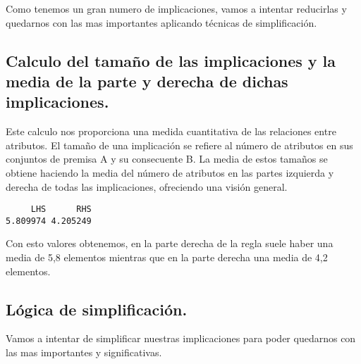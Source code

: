 \documentclass[
  letterpaper,
  DIV=11,
  numbers=noendperiod]{scrreprt}
\newenvironment{Shaded}{\begin{snugshade}}{\end{snugshade}}
\newcommand{\AttributeTok}[1]{\textcolor[rgb]{0.40,0.45,0.13}{#1}}
\newcommand{\FunctionTok}[1]{\textcolor[rgb]{0.28,0.35,0.67}{#1}}
\newcommand{\NormalTok}[1]{\textcolor[rgb]{0.00,0.23,0.31}{#1}}
\newcommand{\SpecialCharTok}[1]{\textcolor[rgb]{0.37,0.37,0.37}{#1}}
\newcommand{\StringTok}[1]{\textcolor[rgb]{0.13,0.47,0.30}{#1}}
\begin{document}
Como tenemos un gran numero de implicaciones, vamos a intentar
reducirlas y quedarnos con las mas importantes aplicando técnicas de
simplificación.

\subsection{Calculo del tamaño de las implicaciones y la media de la
parte y derecha de dichas
implicaciones.}\label{calculo-del-tamauxf1o-de-las-implicaciones-y-la-media-de-la-parte-y-derecha-de-dichas-implicaciones.}

Este calculo nos proporciona una medida cuantitativa de las relaciones
entre atributos. El tamaño de una implicación se refiere al número de
atributos en sus conjuntos de premisa A y su consecuente B. La media de
estos tamaños se obtiene haciendo la media del número de atributos en
las partes izquierda y derecha de todas las implicaciones, ofreciendo
una visión general.

\begin{Shaded}
\end{Shaded}

\begin{verbatim}
     LHS      RHS 
5.809974 4.205249 
\end{verbatim}

Con esto valores obtenemos, en la parte derecha de la regla suele haber
una media de 5,8 elementos mientras que en la parte derecha una media de
4,2 elementos.

\subsection{Lógica de
simplificación.}\label{luxf3gica-de-simplificaciuxf3n.}

Vamos a intentar de simplificar nuestras implicaciones para poder
quedarnos con las mas importantes y significativas.

\begin{Shaded}
\end{Shaded}
\end{document}
